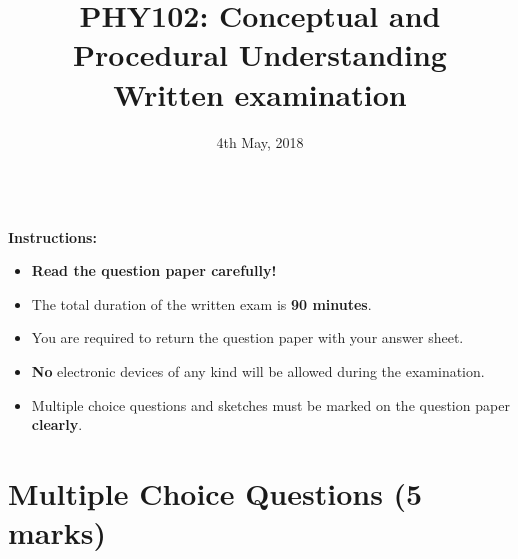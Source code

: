 \title{\vspace{-2cm} PHY102: Conceptual and Procedural Understanding\\\vspace{0.25cm} {Written examination}}
\author{}
\date{\vspace{-2cm} 4th May, 2018}

\maketitle

\vspace{-1.5cm}
\begin{center}
\hrulefill\\
\textbf{Instructions:}

\begin{itemize}
\item \textbf{Read the question paper carefully!}
\item The total duration of the written exam is \textbf{90 minutes}.
\item You are required to return the question paper with your answer sheet.
\item \textbf{No} electronic devices of any kind will be allowed during the examination.
\item Multiple choice questions and sketches must be marked on the question paper \textbf{clearly}.
\end{itemize}
\vspace{-0.9cm}
\hrulefill
\end{center}
\vspace{-0.9cm}
\section*{Multiple Choice Questions \hfill (5 marks)}

